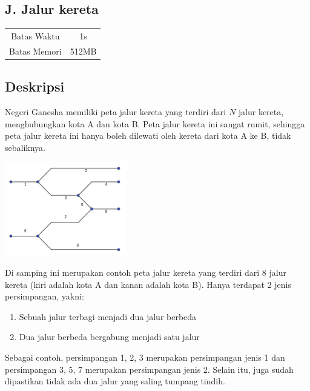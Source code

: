 \documentclass{article}
\begin{document}
\begin{center}
    \section*{J. Jalur kereta}

    \begin{tabular}{ | c c | }
        \hline
        Batas Waktu  & 1s \\
        Batas Memori & 512MB \\
        \hline
    \end{tabular}
\end{center}

\subsection*{Deskripsi}

Negeri Ganesha memiliki peta jalur kereta yang terdiri dari $N$ jalur kereta, menghubungkan kota A dan kota B.
Peta jalur kereta ini sangat rumit, sehingga peta jalur kereta ini hanya boleh dilewati oleh kereta dari kota A ke B, tidak sebaliknya.

\begin{multicols}{2}
\begin{center}
    \includegraphics[width=200px]{sample-1}
\end{center}

Di samping ini merupakan contoh peta jalur kereta yang terdiri dari 8 jalur kereta (kiri adalah kota A dan kanan adalah kota B).
Hanya terdapat 2 jenis persimpangan, yakni:
\begin{enumerate}
    \setlength{\itemsep}{0pt}
    \item Sebuah jalur terbagi menjadi dua jalur berbeda
    \item Dua jalur berbeda bergabung menjadi satu jalur
\end{enumerate}
Sebagai contoh, persimpangan 1, 2, 3 merupakan persimpangan jenis 1 dan persimpangan 3, 5, 7 merupakan persimpangan jenis 2.
Selain itu, juga sudah dipastikan tidak ada dua jalur yang saling tumpang tindih.
\end{multicols}
\end{document}
